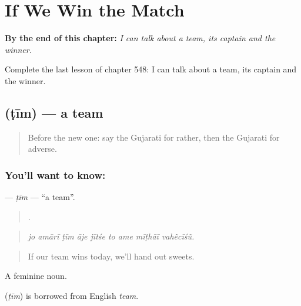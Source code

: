 
\chapter{If We Win the Match}
\label{ch:gu-if-we-win-the-match}

\begin{chapteropening}
\textbf{By the end of this chapter:} \emph{I can talk about a team, its captain and the winner.}

Complete the last lesson of chapter 548: I can talk about a team, its captain and the winner.
\end{chapteropening}

\section[\texorpdfstring{\gu{ટીમ} (ṭīm)}{ટીમ (ṭīm)}]{ (ṭīm) — a team}

\label{lesson:GU-C548-tim}



\begin{quote}
Before the new one: say the Gujarati for rather, then the Gujarati for adverse.
\end{quote}

\subsection*{You'll want to know: }
\textbf{} — \emph{ṭīm} — \textquotedblleft{}a team\textquotedblright{}.

\begin{quote}
        .
\end{quote}

\begin{quote}
\emph{jo amārī ṭīm āje jītśe to ame mīṭhāī vahẽcīśũ.}
\end{quote}

\begin{quote}
If our team wins today, we'll hand out sweets.
\end{quote}

A feminine noun.

\begin{cousinweb}
\textbf{} (\emph{ṭīm}) is borrowed from English \emph{team}.
\end{cousinweb}

